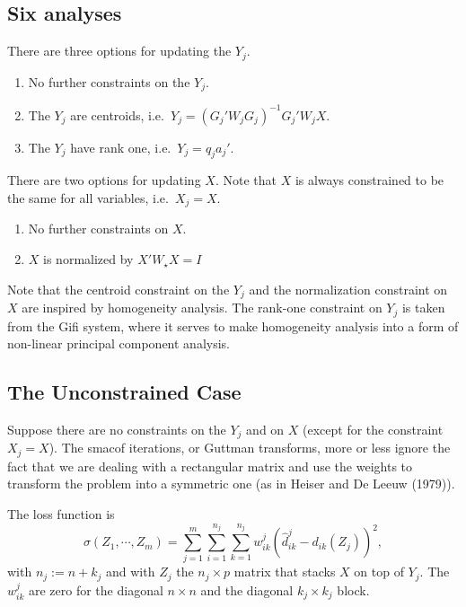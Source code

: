 \documentclass[
  12pt,
]{article}
\providecommand{\tightlist}{%
  \setlength{\itemsep}{0pt}\setlength{\parskip}{0pt}}
\begin{document}
\subsection{Six analyses}\label{six-analyses}

There are three options for updating the \(Y_j\).

\begin{enumerate}
\def\labelenumi{\arabic{enumi}.}
\tightlist
\item
  No further constraints on the \(Y_j\).
\item
  The \(Y_j\) are centroids, i.e.~\(Y_j=(G_j'W_jG_j)^{-1}G_j'W_jX\).
\item
  The \(Y_j\) have rank one, i.e.~\(Y_j=q_ja_j'\).
\end{enumerate}

There are two options for updating \(X\). Note that \(X\) is always
constrained to be the same for all variables, i.e.~\(X_j=X\).

\begin{enumerate}
\def\labelenumi{\arabic{enumi}.}
\tightlist
\item
  No further constraints on \(X\).
\item
  \(X\) is normalized by \(X'W_\star X=I\)
\end{enumerate}

Note that the centroid constraint on the \(Y_j\) and the normalization
constraint on \(X\) are inspired by homogeneity analysis. The rank-one
constraint on \(Y_j\) is taken from the Gifi system, where it serves
to make homogeneity analysis into a form of non-linear principal
component analysis.

\subsection{The Unconstrained Case}\label{the-unconstrained-case}

Suppose there are no constraints on the \(Y_j\) and on \(X\) (except for the
constraint \(X_j=X\)). The smacof iterations, or Guttman transforms, more or less ignore the fact that we are dealing with a rectangular matrix and use the weights to transform the problem into a symmetric one (as in Heiser and De Leeuw (1979)).

The loss function is
\[
\sigma(Z_1,\cdots,Z_m)=\sum_{j=1}^m\sum_{i=1}^{n_j}\sum_{k=1}^{n_j}w_{ik}^j(\hat d_{ik}^j-d_{ik}(Z_j))^2,
\]
with \(n_j:=n+k_j\) and with \(Z_j\) the \(n_j\times p\) matrix that stacks \(X\) on top of
\(Y_j\). The \(w_{ik}^j\) are zero for the diagonal \(n\times n\) and the diagonal
\(k_j\times k_j\) block.
\end{document}
